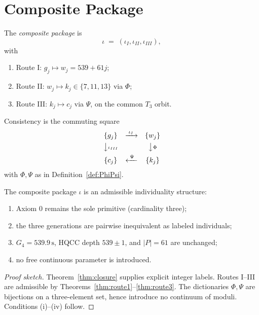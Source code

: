 \section{Composite Package}
\label{sec:composite}

\begin{definition}
\label{def:composite}
The \emph{composite package} is
\[
\iota \;=\; (\iota_I,\iota_{II},\iota_{III}),
\]
with
\begin{enumerate}[label=(\roman*)]
  \item Route I: \(g_j\mapsto w_j=539+61j\);
  \item Route II: \(w_j\mapsto k_j\in\{7,11,13\}\) via \(\Phi\);
  \item Route III: \(k_j\mapsto c_j\) via \(\Psi\), on the common \(T_3\) orbit.
\end{enumerate}
Consistency is the commuting square
\begin{equation}
\label{eq:dictionary}
\begin{array}{ccc}
\{g_j\} & \xrightarrow{\;\iota_I\;} & \{w_j\} \\[4pt]
\big\downarrow{\scriptstyle \iota_{III}} & & \big\downarrow{\scriptstyle \Phi} \\[4pt]
\{c_j\} & \xleftarrow{\;\Psi\;} & \{k_j\}
\end{array}
\end{equation}
with \(\Phi,\Psi\) as in Definition~\ref{def:PhiPsi}.
\end{definition}

\begin{theorem}
\label{thm:main}
The composite package \(\iota\) is an admissible individuality structure:
\begin{enumerate}[label=(\roman*)]
  \item Axiom 0 remains the sole primitive (cardinality three);
  \item the three generations are pairwise inequivalent as labeled individuals;
  \item \(G_4=539.9\,\mathrm{s}\), HQCC depth \(539\pm 1\), and \(|P|=61\) are
        unchanged;
  \item no free continuous parameter is introduced.
\end{enumerate}
\end{theorem}

\begin{proof}[Proof sketch]
Theorem~\ref{thm:closure} supplies explicit integer labels. Routes I--III are
admissible by Theorems~\ref{thm:route1}--\ref{thm:route3}. The dictionaries
\(\Phi,\Psi\) are bijections on a three-element set, hence introduce no continuum
of moduli. Conditions (i)--(iv) follow.
\end{proof}

